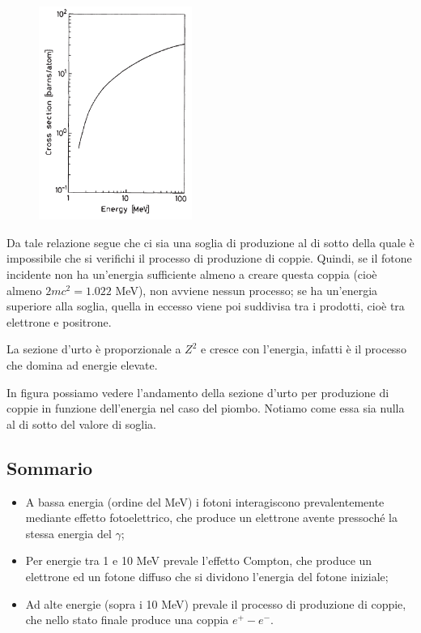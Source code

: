 \begin{minipage}{0.395\textwidth}
    \begin{figure}[H]
        \centering
        \includegraphics[width=5cm]{immagini/sezione_durto_produzione_coppie.png}
    \end{figure}
\end{minipage}
\begin{minipage}{0.6\textwidth}
    Da tale relazione segue che ci sia una soglia di produzione al di sotto della quale è impossibile che si verifichi il processo di produzione di coppie. Quindi, se il fotone incidente non ha un'energia sufficiente almeno a creare questa coppia (cioè almeno $2mc^2=1.022$ MeV), non avviene nessun processo; se ha un'energia superiore alla soglia, quella in eccesso viene poi suddivisa tra i prodotti, cioè tra elettrone e positrone.

    La sezione d'urto è proporzionale a $Z^2$ e cresce con l'energia, infatti è il processo che domina ad energie elevate.
\end{minipage}

\vspace{0.2cm}In figura possiamo vedere l'andamento della sezione d'urto per produzione di coppie in funzione dell'energia nel caso del piombo. Notiamo come essa sia nulla al di sotto del valore di soglia.

\subsection{Sommario}

\begin{itemize}
    \item A bassa energia (ordine del MeV) i fotoni interagiscono prevalentemente mediante effetto fotoelettrico, che produce un elettrone avente pressoché la stessa energia del $\gamma$;

    \item Per energie tra 1 e 10 MeV prevale l'effetto Compton, che produce un elettrone ed un fotone diffuso che si dividono l'energia del fotone iniziale;
    \item Ad alte energie (sopra i 10 MeV) prevale il processo di produzione di coppie, che nello stato finale produce una coppia $e^+ - e^-$.
\end{itemize}

